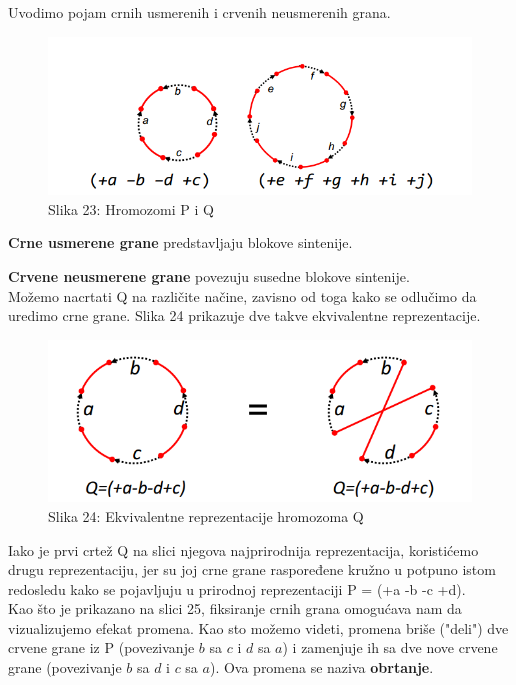 \documentclass{article}
\begin{document}
\noindent Uvodimo pojam crnih usmerenih i crvenih neusmerenih grana.

\begin{figure}[h!]
\centering
\includegraphics[scale=0.6]{slike/crne_crvene.PNG}
\caption{Slika 23: Hromozomi P i Q}
\label{slika:X}
\end{figure}

\noindent \textbf{Crne usmerene grane} predstavljaju blokove sintenije.

\noindent \textbf{Crvene neusmerene grane} povezuju susedne blokove sintenije.\\

Možemo nacrtati Q na različite načine, zavisno od toga kako se odlučimo da uredimo crne grane. Slika 24 prikazuje dve takve ekvivalentne reprezentacije.\\

\begin{figure}[h!]
\centering
\includegraphics[scale=0.6]{slike/ekvivalentne.PNG}
\caption{Slika 24: Ekvivalentne reprezentacije hromozoma Q}
\label{slika:X}
\end{figure}

\newpage
Iako je prvi crtež Q na slici njegova najprirodnija reprezentacija, koristićemo drugu reprezentaciju, jer su joj crne grane raspoređene kružno u potpuno istom redosledu kako se pojavljuju u prirodnoj reprezentaciji P = (+a -b -c +d).\\

Kao što je prikazano na slici 25, fiksiranje crnih grana omogućava nam da vizualizujemo efekat promena. Kao sto možemo videti, promena briše ("deli") dve crvene grane iz P (povezivanje $b$ sa $c$ i $d$ sa $a$) i zamenjuje ih sa dve nove crvene grane (povezivanje $b$ sa $d$ i $c$ sa $a$). Ova promena se naziva \textbf{obrtanje}.\\
\end{document}
